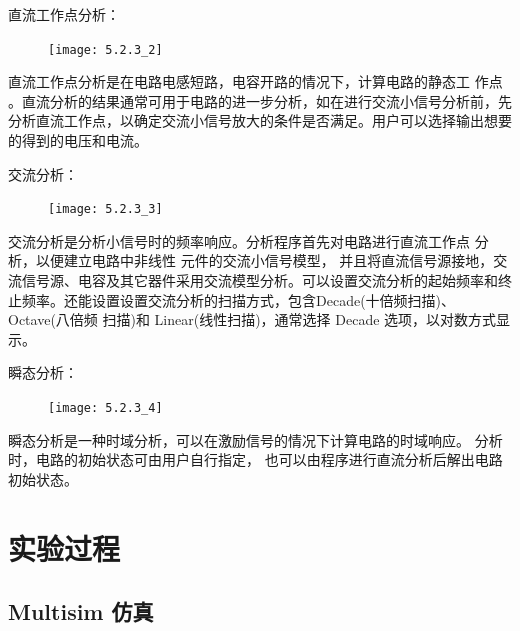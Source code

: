 \documentclass[a4paper,11pt,UTF8]{article}
\numberwithin{equation}{subsection}
\begin{document}
直流工作点分析：
\begin{figure}[H]
	\centering
	\texttt{[image: 5.2.3\_2]}	
\end{figure}

直流工作点分析是在电路电感短路，电容开路的情况下，计算电路的静态工
作点 。直流分析的结果通常可用于电路的进一步分析，如在进行交流小信号分析前，先分析直流工作点，以确定交流小信号放大的条件是否满足。用户可以选择输出想要的得到的电压和电流。

交流分析：
\begin{figure}[H]
	\centering
	\texttt{[image: 5.2.3\_3]}	
\end{figure}

交流分析是分析小信号时的频率响应。分析程序首先对电路进行直流工作点
分析，以便建立电路中非线性 元件的交流小信号模型， 并且将直流信号源接地，交流信号源、电容及其它器件采用交流模型分析。可以设置交流分析的起始频率和终止频率。还能设置设置交流分析的扫描方式，包含Decade(十倍频扫描)、 Octave(八倍频 扫描)和 Linear(线性扫描)，通常选择 Decade 选项，以对数方式显示。

瞬态分析：
\begin{figure}[H]
	\centering
	\texttt{[image: 5.2.3\_4]}	
\end{figure}

瞬态分析是一种时域分析，可以在激励信号的情况下计算电路的时域响应。
分析时，电路的初始状态可由用户自行指定， 也可以由程序进行直流分析后解出电路初始状态。

\section{实验过程}
\subsection{Multisim 仿真}
\end{document}
